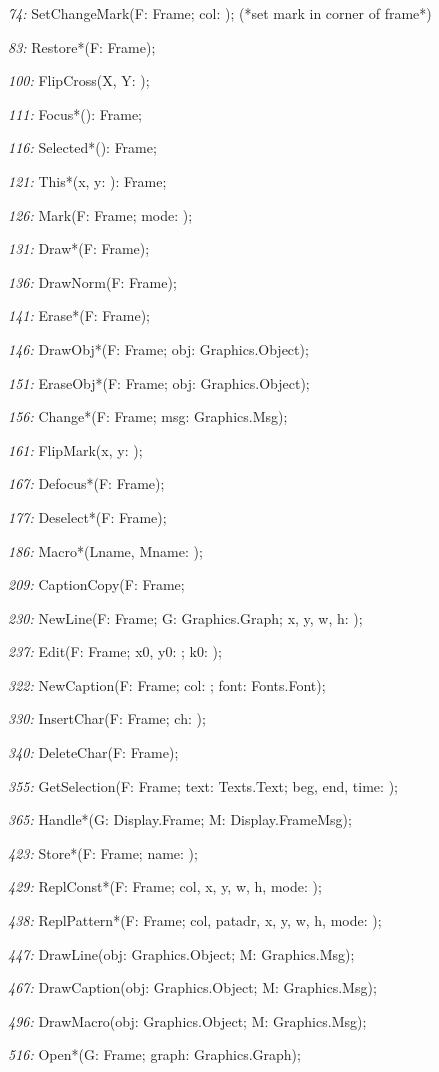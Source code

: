 \item{\it 74:} SetChangeMark(F: Frame; col: \INTEGER); (*set mark in corner of frame*)
\item{\it 83:} Restore*(F: Frame);
\item{\it 100:} FlipCross(X, Y: \INTEGER);
\item{\it 111:} Focus*(): Frame;
\item{\it 116:} Selected*(): Frame;
\item{\it 121:} This*(x, y: \INTEGER): Frame;
\item{\it 126:} Mark(F: Frame; mode: \INTEGER);
\item{\it 131:} Draw*(F: Frame);
\item{\it 136:} DrawNorm(F: Frame);
\item{\it 141:} Erase*(F: Frame);
\item{\it 146:} DrawObj*(F: Frame; obj: Graphics.Object);
\item{\it 151:} EraseObj*(F: Frame; obj: Graphics.Object);
\item{\it 156:} Change*(F: Frame; \VAR msg: Graphics.Msg);
\item{\it 161:} FlipMark(x, y: \INTEGER);
\item{\it 167:} Defocus*(F: Frame);
\item{\it 177:} Deselect*(F: Frame);
\item{\it 186:} Macro*(Lname, Mname: \ARRAYOF\CHAR);
\item{\it 209:} CaptionCopy(F: Frame;
\item{\it 230:} NewLine(F: Frame; G: Graphics.Graph; x, y, w, h: \INTEGER);
\item{\it 237:} Edit(F: Frame; x0, y0: \INTEGER; k0: \SET);
\item{\it 322:} NewCaption(F: Frame; col: \INTEGER; font: Fonts.Font);
\item{\it 330:} InsertChar(F: Frame; ch: \CHAR);
\item{\it 340:} DeleteChar(F: Frame);
\item{\it 355:} GetSelection(F: Frame; \VAR text: Texts.Text; \VAR beg, end, time: \LONGINT);
\item{\it 365:} Handle*(G: Display.Frame; \VAR M: Display.FrameMsg);
\item{\it 423:} Store*(F: Frame; name: \ARRAYOF\CHAR);
\item{\it 429:} ReplConst*(F: Frame; col, x, y, w, h, mode: \INTEGER);
\item{\it 438:} ReplPattern*(F: Frame; col, patadr, x, y, w, h, mode: \INTEGER);
\item{\it 447:} DrawLine(obj: Graphics.Object; \VAR M: Graphics.Msg);
\item{\it 467:} DrawCaption(obj: Graphics.Object; \VAR M: Graphics.Msg);
\item{\it 496:} DrawMacro(obj: Graphics.Object; \VAR M: Graphics.Msg);
\item{\it 516:} Open*(G: Frame; graph: Graphics.Graph); 

